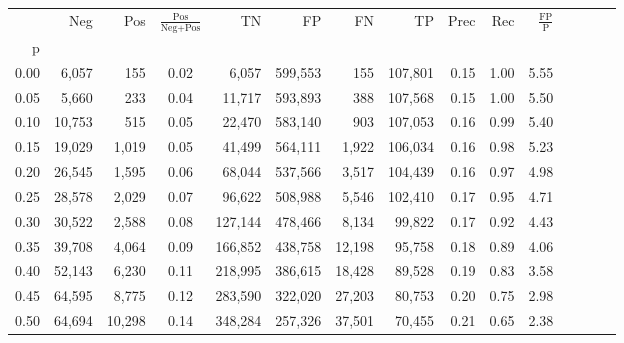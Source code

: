 \begin{tabular}{rrrcrrrrrrrrrrr}
\toprule
{} &     Neg &     Pos & $\frac{\text{Pos}}{\text{Neg}+\text{Pos}}$ &       TN &       FP &       FN &       TP &  Prec &   Rec & $\frac{\text{FP}}{\text{P}}$ \\
p    &         &         &                                            &          &          &          &          &       &       &                              \\
\midrule
0.00 &   6,057 &     155 &                                       0.02 &    6,057 &  599,553 &      155 &  107,801 &  0.15 &  1.00 &                         5.55 \\
0.05 &   5,660 &     233 &                                       0.04 &   11,717 &  593,893 &      388 &  107,568 &  0.15 &  1.00 &                         5.50 \\
0.10 &  10,753 &     515 &                                       0.05 &   22,470 &  583,140 &      903 &  107,053 &  0.16 &  0.99 &                         5.40 \\
0.15 &  19,029 &   1,019 &                                       0.05 &   41,499 &  564,111 &    1,922 &  106,034 &  0.16 &  0.98 &                         5.23 \\
0.20 &  26,545 &   1,595 &                                       0.06 &   68,044 &  537,566 &    3,517 &  104,439 &  0.16 &  0.97 &                         4.98 \\
0.25 &  28,578 &   2,029 &                                       0.07 &   96,622 &  508,988 &    5,546 &  102,410 &  0.17 &  0.95 &                         4.71 \\
0.30 &  30,522 &   2,588 &                                       0.08 &  127,144 &  478,466 &    8,134 &   99,822 &  0.17 &  0.92 &                         4.43 \\
0.35 &  39,708 &   4,064 &                                       0.09 &  166,852 &  438,758 &   12,198 &   95,758 &  0.18 &  0.89 &                         4.06 \\
0.40 &  52,143 &   6,230 &                                       0.11 &  218,995 &  386,615 &   18,428 &   89,528 &  0.19 &  0.83 &                         3.58 \\
0.45 &  64,595 &   8,775 &                                       0.12 &  283,590 &  322,020 &   27,203 &   80,753 &  0.20 &  0.75 &                         2.98 \\
0.50 &  64,694 &  10,298 &                                       0.14 &  348,284 &  257,326 &   37,501 &   70,455 &  0.21 &  0.65 &                         2.38 \\

\end{tabular}

